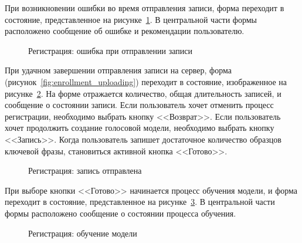 При возникновении ошибки во время отправления записи, форма переходит в состояние, представленное на рисунке~\ref{fig:enrollment_upload_error}. В центральной части формы расположено сообщение об ошибке и рекомендации пользователю. 


\begin{figure}[hbt!]
\caption{Регистрация: ошибка при отправлении записи}
\label{fig:enrollment_upload_error}
\end{figure}



При удачном завершении отправления записи на сервер, форма
(рисунок~\ref{fig:enrollment_uploading}) переходит в состояние, изображенное на
рисунке~\ref{fig:enrollment_uploaded}. На форме отражается количество, общая
длительность записей, и сообщение о состоянии записи. Если пользователь хочет
отменить процесс регистрации, необходимо выбрать кнопку <<Возврат>>. Если
пользователь хочет продолжить создание голосовой модели, необходимо выбрать
кнопку <<Запись>>. Когда пользователь запишет достаточное количество образцов
ключевой фразы, становиться активной кнопка <<Готово>>.


\begin{figure}[hbt!]
\caption{Регистрация: запись отправлена}
\label{fig:enrollment_uploaded}
\end{figure}

При выборе кнопки <<Готово>> начинается процесс обучения модели, и форма переходит в состояние, представленное на рисунке~\ref{fig:enrollment_in_process}. В центральной части формы расположено сообщение о состоянии процесса обучения.

\begin{figure}[hbt!]
\caption{Регистрация: обучение модели}
\label{fig:enrollment_in_process}
\end{figure}


